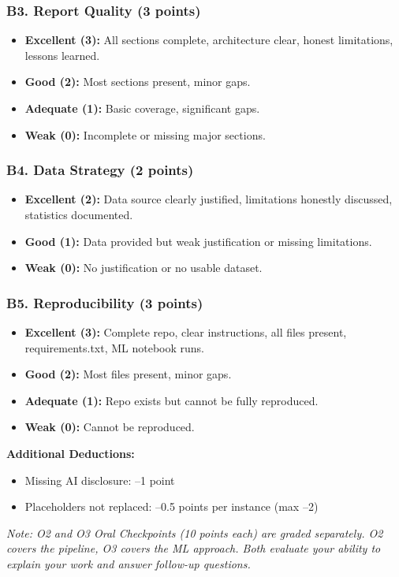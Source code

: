 \documentclass[11pt]{article}
\begin{document}
\subsubsection*{B3. Report Quality (3 points)}
\begin{itemize}[noitemsep]
    \item \textbf{Excellent (3):} All sections complete, architecture clear, honest limitations, lessons learned.
    \item \textbf{Good (2):} Most sections present, minor gaps.
    \item \textbf{Adequate (1):} Basic coverage, significant gaps.
    \item \textbf{Weak (0):} Incomplete or missing major sections.
\end{itemize}

\subsubsection*{B4. Data Strategy (2 points)}
\begin{itemize}[noitemsep]
    \item \textbf{Excellent (2):} Data source clearly justified, limitations honestly discussed, statistics documented.
    \item \textbf{Good (1):} Data provided but weak justification or missing limitations.
    \item \textbf{Weak (0):} No justification or no usable dataset.
\end{itemize}

\subsubsection*{B5. Reproducibility (3 points)}
\begin{itemize}[noitemsep]
    \item \textbf{Excellent (3):} Complete repo, clear instructions, all files present, requirements.txt, ML notebook runs.
    \item \textbf{Good (2):} Most files present, minor gaps.
    \item \textbf{Adequate (1):} Repo exists but cannot be fully reproduced.
    \item \textbf{Weak (0):} Cannot be reproduced.
\end{itemize}

\vspace{2em}
\hrulefill

\textbf{Additional Deductions:}
\begin{itemize}[noitemsep]
    \item Missing AI disclosure: --1 point
    \item Placeholders not replaced: --0.5 points per instance (max --2)
\end{itemize}

\vspace{1em}

\textit{Note: O2 and O3 Oral Checkpoints (10 points each) are graded separately. O2 covers the pipeline, O3 covers the ML approach. Both evaluate your ability to explain your work and answer follow-up questions.}
\end{document}
